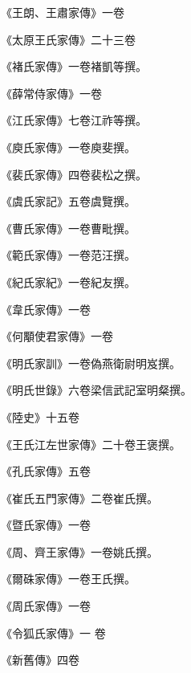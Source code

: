 \begin{pinyinscope}
 《王朗、王肅家傳》一卷



 《太原王氏家傳》二十三卷



 《褚氏家傳》一卷褚凱等撰。



 《薛常侍家傳》一卷



 《江氏家傳》七卷江祚等撰。



 《庾氏家傳》一卷庾斐撰。



 《裴氏家傳》四卷裴松之撰。



 《虞氏家記》五卷虞覽撰。



 《曹氏家傳》一卷曹毗撰。



 《範氏家傳》一卷范汪撰。



 《紀氏家紀》一卷紀友撰。



 《韋氏家傳》一卷



 《何顒使君家傳》一卷



 《明氏家訓》一卷偽燕衛尉明岌撰。



 《明氏世錄》六卷梁信武記室明粲撰。



 《陸史》十五卷



 《王氏江左世家傳》二十卷王褒撰。



 《孔氏家傳》五卷



 《崔氏五門家傳》二卷崔氏撰。



 《暨氏家傳》一卷



 《周、齊王家傳》一卷姚氏撰。



 《爾硃家傳》一卷王氏撰。



 《周氏家傳》一卷



 《令狐氏家傳》一
 卷



 《新舊傳》四卷




\end{pinyinscope}
